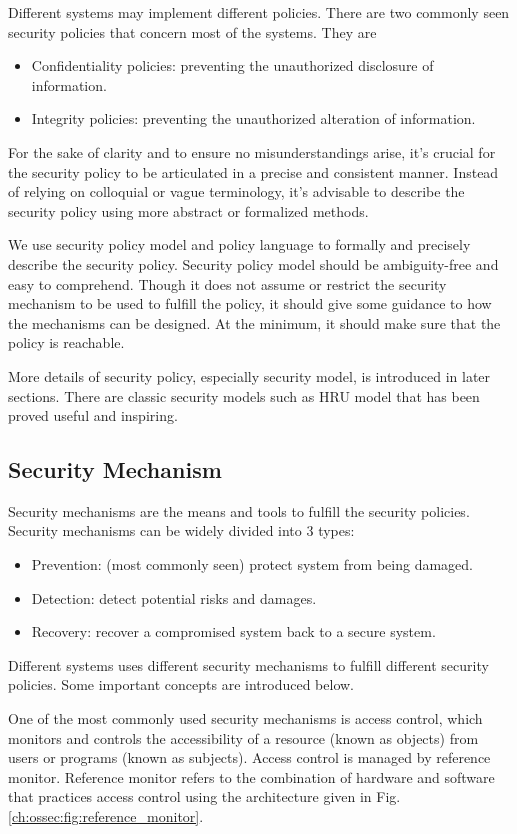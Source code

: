 Different systems may implement different policies. There are two commonly seen security policies that concern most of the systems. They are
\begin{itemize}
  \item Confidentiality policies: preventing the unauthorized disclosure of information.
  \item Integrity policies: preventing the unauthorized alteration of information.
\end{itemize}

For the sake of clarity and to ensure no misunderstandings arise, it's crucial for the security policy to be articulated in a precise and consistent manner. Instead of relying on colloquial or vague terminology, it's advisable to describe the security policy using more abstract or formalized methods. 

We use security policy model and policy language to formally and precisely describe the security policy. Security policy model should be ambiguity-free and easy to comprehend. Though it does not assume or restrict the security mechanism to be used to fulfill the policy, it should give some guidance to how the mechanisms can be designed. At the minimum, it should make sure that the policy is reachable.

More details of security policy, especially security model, is introduced in later sections. There are classic security models such as HRU model that has been proved useful and inspiring.

\subsection{Security Mechanism}

Security mechanisms are the means and tools to fulfill the security policies. Security mechanisms can be widely divided into 3 types:
\begin{itemize}
  \item Prevention: (most commonly seen) protect system from being damaged.
  \item Detection: detect potential risks and damages.
  \item Recovery: recover a compromised system back to a secure system.
\end{itemize}

Different systems uses different security mechanisms to fulfill different security policies. Some important concepts are introduced below.

One of the most commonly used security mechanisms is access control, which monitors and controls the accessibility of a resource (known as objects) from users or programs (known as subjects). Access control is managed by reference monitor. Reference monitor refers to the combination of hardware and software that practices access control using the architecture given in Fig. \ref{ch:ossec:fig:reference_monitor}.

